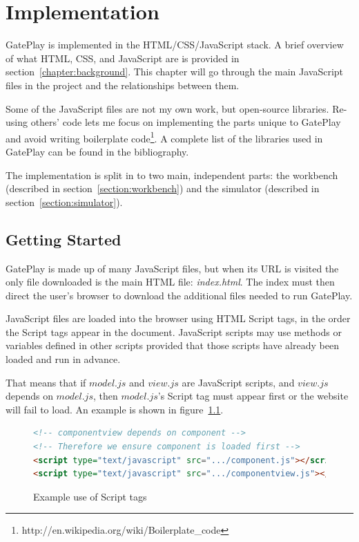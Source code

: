 \chapter{Implementation}
\label{chapter:implementation}

GatePlay is implemented in the HTML/CSS/JavaScript stack. A brief overview of what HTML, CSS, and JavaScript are is provided in section~\ref{chapter:background}. This chapter will go through the main JavaScript files in the project and the relationships between them.

Some of the JavaScript files are not my own work, but open-source libraries. Re-using others' code lets me focus on implementing the parts unique to GatePlay and avoid writing boilerplate code\footnote{http://en.wikipedia.org/wiki/Boilerplate\_code}. A complete list of the libraries used in GatePlay can be found in the bibliography.

The implementation is split in to two main, independent parts: the workbench (described in section~\ref{section:workbench}) and the simulator (described in section~\ref{section:simulator}).

\section{Getting Started}
GatePlay is made up of many JavaScript files, but when its URL is visited the only file downloaded is the main HTML file: \textit{index.html}. The index must then direct the user's browser to download the additional files needed to run GatePlay.

JavaScript files are loaded into the browser using HTML Script tags, in the order the Script tags appear in the document. JavaScript scripts may use methods or variables defined in other scripts provided that those scripts have already been loaded and run in advance.

That means that if $model.js$ and $view.js$ are JavaScript scripts, and $view.js$ depends on $model.js$, then $model.js$'s Script tag must appear first or the website will fail to load. An example is shown in figure~\ref{fig:scripttags}.

\begin{figure}[H]
\begin{lstlisting}[language=html]
<!-- componentview depends on component -->
<!-- Therefore we ensure component is loaded first -->
<script type="text/javascript" src=".../component.js"></script>
<script type="text/javascript" src=".../componentview.js"></script>
\end{lstlisting}
\caption{Example use of Script tags}
\label{fig:scripttags}
\end{figure}

